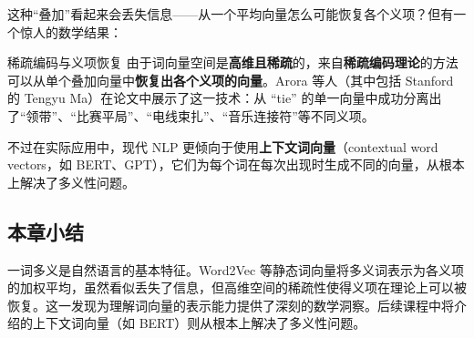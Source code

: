 这种``叠加''看起来会丢失信息——从一个平均向量怎么可能恢复各个义项？但有一个惊人的数学结果：

\begin{knowledgebox}{稀疏编码与义项恢复}
由于词向量空间是\textbf{高维且稀疏}的，来自\textbf{稀疏编码理论}的方法可以从单个叠加向量中\textbf{恢复出各个义项的向量}。Arora 等人（其中包括 Stanford 的 Tengyu Ma）在论文中展示了这一技术：从 ``tie'' 的单一向量中成功分离出了``领带''、``比赛平局''、``电线束扎''、``音乐连接符''等不同义项。
\end{knowledgebox}

不过在实际应用中，现代 NLP 更倾向于使用\textbf{上下文词向量}（contextual word vectors，如 BERT、GPT），它们为每个词在每次出现时生成不同的向量，从根本上解决了多义性问题。

\subsection{本章小结}

一词多义是自然语言的基本特征。Word2Vec 等静态词向量将多义词表示为各义项的加权平均，虽然看似丢失了信息，但高维空间的稀疏性使得义项在理论上可以被恢复。这一发现为理解词向量的表示能力提供了深刻的数学洞察。后续课程中将介绍的上下文词向量（如 BERT）则从根本上解决了多义性问题。


